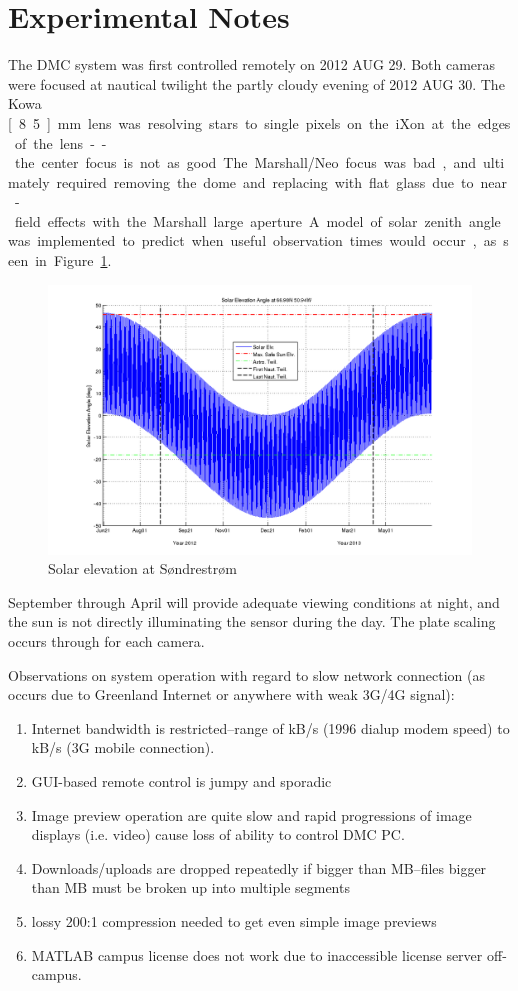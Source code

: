 \section{Experimental Notes}
The DMC system was first controlled remotely on 2012 AUG 29. 
Both cameras were focused at nautical twilight the partly cloudy evening of 2012 AUG 30. 
The Kowa \unit[8.5]{mm} lens was resolving stars to single pixels on the iXon at the edges of the lens--the center focus is not as good. 
The Marshall/Neo focus was bad, and ultimately required removing the dome and replacing with flat glass due to near-field effects with the Marshall large aperture. 
A model of solar zenith angle was implemented to predict when useful observation times would occur, as seen in Figure~\ref{fig:solar2012}. 
\begin{figure}\centering
	\includegraphics[width=\textwidth]{gfx/Solar2012}
	\caption{Solar elevation at Søndrestrøm}\label{fig:solar2012}
\end{figure}
September through April will provide adequate viewing conditions at night, and the sun is not directly illuminating the sensor during the day.
The plate scaling occurs through \citet{hirschastro,lang2010} for each camera.

Observations on system operation with regard to slow network connection (as occurs due to Greenland Internet or anywhere with weak 3G/4G signal):
\begin{enumerate}
    \item Internet bandwidth is restricted--range of \unit[5]{kB/s} (1996 dialup modem speed) to \unit[60]{kB/s} (3G mobile connection). 
    \item GUI-based remote control is jumpy and sporadic 
    \item Image preview operation are quite slow and rapid progressions of image displays (i.e. video) cause loss of ability to control DMC PC.
    \item Downloads/uploads are dropped repeatedly if bigger than \unit[5]{MB}--files bigger than \unit[5]{MB} must be broken up into multiple segments
    \item lossy 200:1 compression needed to get even simple image previews 
    \item MATLAB campus license does not work due to inaccessible license server off-campus.
\end{enumerate}

